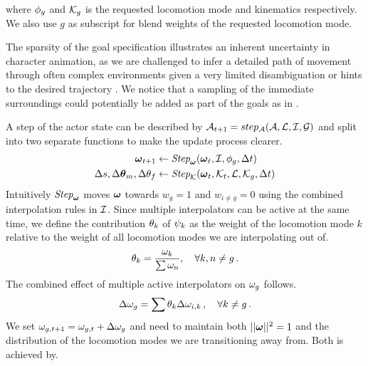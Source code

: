 where $\phi_g$ and $\mathcal{K}_g$ is the requested locomotion mode and kinematics respectively. We also use $g$ as subscript for blend weights of the requested locomotion mode.

The sparsity of the goal specification illustrates an inherent uncertainty in character animation, as we are challenged to infer a detailed path of movement through often complex environments given a very limited disambiguation or hints to the desired trajectory \cite{holden.ea16}. We notice that a sampling of the immediate surroundings could potentially be added as part of the goals as in \cite{holden.ea17}. 

A step of the actor state can be described by $\mathcal{A}_{t+1} = step_{\mathcal{A}}(\mathcal{A}, \mathcal{L}, \mathcal{I}, \mathcal{G})$ and split into two separate functions to make the update process clearer.
\begin{subequations}
\begin{align}
    \boldsymbol{\omega }_{t+1} &\leftarrow \textit{Step}_{\boldsymbol{\omega }}( \boldsymbol{\omega }_{t}, \mathcal{I}, \phi_g, \Delta{t}) \label{eq:step:interpolators}\\
    \Delta{s}, {\Delta{ \boldsymbol{\theta } }_m}, {\Delta{\theta}_f} &\leftarrow  \textit{Step}_{\mathcal{K}}(\boldsymbol{\omega }_t, \mathcal{K}_{t},  \mathcal{L}, \mathcal{K}_{g}, \Delta{t} )\label{eq:step:modes}
\end{align}
\end{subequations}
Intuitively $\textit{Step}_{\boldsymbol{\omega }}$ moves $\boldsymbol{\omega }$ towards $w_g=1$ and $w_{i\neq{g}}=0$ using the combined interpolation rules in $\mathcal{I}$. Since multiple interpolators can be active at the same time, we define the contribution $\theta_k$ of $\psi_k$ as the weight of the locomotion mode $k$ relative to the weight of all locomotion modes we are interpolating out of. 
\begin{equation}
\theta_{k}=\dfrac{\omega_k}{\sum{ \omega _n}},
\quad \forall k, n \neq g \,.
\end{equation}
The combined effect of multiple active interpolators on $\omega_g$ follows.
\begin{equation}
\Delta{ \omega }_g = \sum \theta_k \Delta{ \omega }_{i,k} \,,
\quad \forall k \neq g \,.
\end{equation}
We set $\omega_{g,t+1}=\omega_{g,t}+\Delta{ \omega }_g$ and need to maintain both $||\boldsymbol{\omega }||^2=1$ and the distribution of the locomotion modes we are transitioning away from. Both is achieved by.

